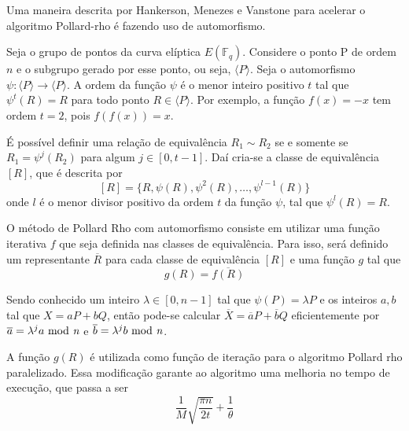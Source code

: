 Uma maneira descrita por Hankerson, Menezes e Vanstone para acelerar o algoritmo Pollard-rho é fazendo uso de automorfismo.\cite{Guide}

Seja o grupo de pontos da curva elíptica $E(\mathbb{F}_q)$. Considere o ponto P de ordem \(n\) e o subgrupo gerado por esse ponto, ou seja, $\langle P \rangle$. Seja o automorfismo $\psi: \langle P \rangle \to \langle P \rangle$. A ordem da função $\psi$ é o menor inteiro positivo $t$ tal que $\psi^t(R) = R$ para todo ponto $R \in \langle P \rangle$. Por exemplo, a função $f(x) = -x$ tem ordem $t = 2$, pois $f(f(x)) = x$.

É possível definir uma relação de equivalência $R_1 \sim R_2$ se e somente se $R_1 = \psi^j(R_2)$ para algum $j \in [0, t - 1]$. Daí cria-se a classe de equivalência $[R]$, que é descrita por
$$
[R] = \{R, \psi(R), \psi^2(R), \dots, \psi^{l-1}(R)\}
$$
onde $l$ é o menor divisor positivo da ordem $t$ da função $\psi$, tal que $\psi^l(R) = R$.

O método de Pollard Rho com automorfismo consiste em utilizar uma função iterativa $f$ que seja definida nas classes de equivalência. Para isso, será definido um representante $\overline{R}$ para cada classe de equivalência $[R]$ e uma função $g$ tal que
$$
g(R) = \overline{f(R)}
$$

Sendo conhecido um inteiro $\lambda \in [0, n - 1]$ tal que $\psi(P) = \lambda P$ e os inteiros $a,b$ tal que $X = aP + bQ$, então pode-se calcular $\overline{X} = \overline{a}P + \overline{b}Q$ eficientemente por $\overline{a} = \lambda^{j}a \mbox{ mod \textit{n}}$ e $\overline{b} = \lambda^{j}b \mbox{ mod \textit{n}}$.

A função $g(R)$ é utilizada como função de iteração para o algoritmo Pollard rho paralelizado. Essa modificação garante ao algoritmo uma melhoria no tempo de execução, que passa a ser
$$
\frac{1}{M} \sqrt{ \frac{\pi n}{2t} } + \frac{1}{\theta}
$$

